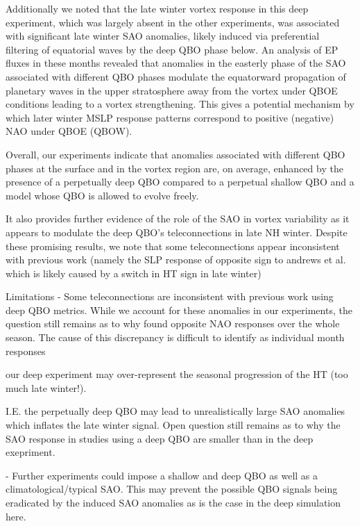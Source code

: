 Additionally we noted that the late winter vortex response in this deep experiment, which was largely absent in the other experiments, was associated with significant late winter SAO anomalies, likely induced via preferential filtering of equatorial waves by the deep QBO phase below. An analysis of EP fluxes in these months revealed that anomalies in the easterly phase of the SAO associated with different QBO phases modulate the equatorward propagation of planetary waves in the upper stratosphere away from the vortex under QBOE conditions leading to a vortex strengthening. This gives a potential mechanism by which later winter MSLP response patterns correspond to positive (negative) NAO under QBOE (QBOW). 

Overall, our experiments indicate that anomalies associated with different QBO phases at the surface and in the vortex region are, on average, enhanced by the presence of a perpetually deep QBO compared to a perpetual shallow QBO and a model whose QBO is allowed to evolve freely. 

It also provides further evidence of the role of the SAO in vortex variability as it appears to modulate the deep QBO's teleconnections in late NH winter. Despite these promising results, we note that some teleconnections appear inconsistent with previous work (namely the SLP response of opposite sign to andrews et al. which is likely caused by a switch in HT sign in late winter) 

Limitations
- Some teleconnections are inconsistent with previous work using deep QBO metrics. While we account for these anomalies in our experiments, the question still remains as to why \cite{andrewsObserved2019d} found opposite NAO responses over the whole season. The cause of this discrepancy is difficult to identify as individual month responses 

    our deep experiment may over-represent the seasonal progression of the HT (too much late winter!). 

    I.E. the perpetually deep QBO may lead to unrealistically large SAO anomalies which inflates the late winter signal. Open question still remains as to why the SAO response in studies using a deep QBO are smaller than in the deep exepriment. 
    
    - Further experiments could impose a shallow and deep QBO as well as a climatological/typical SAO. This may prevent the possible QBO signals being eradicated by the induced SAO anomalies as is the case in the deep simulation here. 

